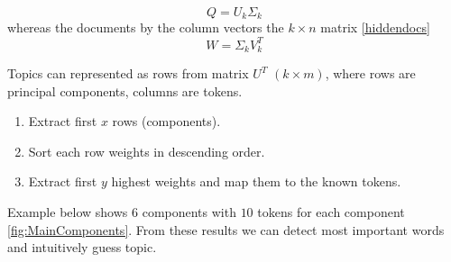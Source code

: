 \documentclass{article}
\begin{document}
\begin{equation}
\label{hiddenterms}
Q = U_k\Sigma_k
\end{equation}
whereas the documents by the column vectors the $k \times n$ matrix \ref{hiddendocs}
 \begin{equation}
\label{hiddendocs}
W =\Sigma_kV_k^T
\end{equation}

Topics can represented as rows from matrix $U^T$ $(k \times m)$, where rows are principal components, columns are tokens. 
\begin{enumerate}
\item Extract first $x$ rows (components).
\item Sort each row weights in descending order.
\item Extract first $y$ highest weights and map them to the known tokens.
\end{enumerate}


 Example below shows $6$ components with $10$ tokens for each component \ref{fig:MainComponents}. From these results we can detect most important words and intuitively guess topic.
\end{document}

